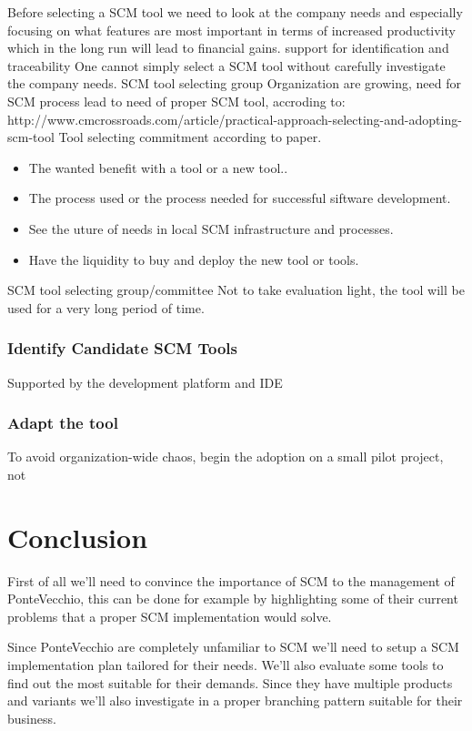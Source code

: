 \documentclass[10pt]{article}
\begin{document}
Before selecting a SCM tool we need to look at the company needs and especially focusing on what features are most important in terms of increased productivity which in the long run will lead to financial gains. 
support for identification and traceability
One cannot simply select a SCM tool without carefully investigate the company needs.
SCM tool selecting group
Organization are growing, need for SCM process lead to need of proper SCM tool,  accroding to: http://www.cmcrossroads.com/article/practical-approach-selecting-and-adopting-scm-tool
Tool selecting commitment according to paper. 
\begin{itemize}
\item The wanted benefit with a tool or a new tool..
\item The process used or the process needed for successful siftware development.
\item See the uture of needs in local SCM infrastructure and processes.
\item Have the liquidity to buy and deploy the new tool or tools.
\end{itemize}
SCM tool selecting group/committee
Not to take evaluation light, the tool will be used for a very long period of time.
\subsubsection{Identify Candidate SCM Tools}
Supported by the development platform and IDE

\subsubsection{Adapt the tool}
To avoid organization-wide chaos, begin the adoption on a small pilot project, not

\section{Conclusion}

First of all we’ll need to convince the importance of SCM to the management of PonteVecchio, this can be done for example by highlighting some of their current problems that a proper SCM implementation would solve.

\noindent Since PonteVecchio are completely unfamiliar to SCM we’ll need to setup a SCM implementation plan tailored for their needs. We’ll also evaluate some tools to find out the most suitable for their demands. 
Since they have multiple products and variants we’ll also investigate in a proper branching pattern suitable for their business.
\end{document}
